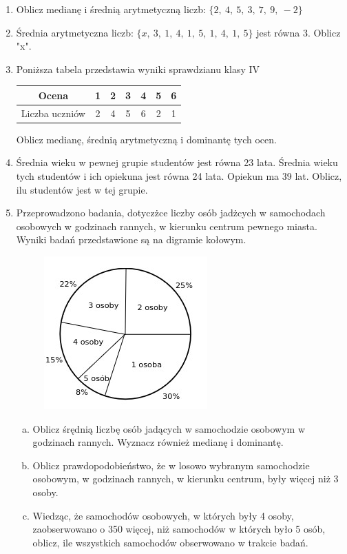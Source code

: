 \documentclass[12pt,a4paper]{article}
\begin{document}
\begin{enumerate}[1.]
	\item Oblicz medianę i średnią arytmetyczną liczb: $\{2,\:4,\:5,\:3,\:7,\:9,\:-2\}$
	\item Średnia arytmetyczna liczb: $\{x,\:3,\:1,\:4,\:1,\:5,\:1,\:4,\:1,\:5\}$ jest równa 3. Oblicz "x".
	\item Poniższa tabela przedstawia wyniki sprawdzianu klasy IV
	
	\begin{tabular}{|c|c|c|c|c|c|c|}
		\hline
		Ocena&1&2&3&4&5&6\\
		\hline
		Liczba uczniów&2&4&5&6&2&1\\
		\hline
	\end{tabular}
	
	Oblicz medianę, średnią arytmetyczną i dominantę tych ocen.
	
	\item Średnia wieku w pewnej grupie studentów jest równa 23 lata. Średnia wieku tych studentów i ich opiekuna jest równa 24 lata. Opiekun ma 39 lat. Oblicz, ilu studentów jest w tej grupie.
	
	\item Przeprowadzono badania, dotyczżce liczby osób jadżcych w samochodach osobowych w godzinach rannych, w kierunku centrum pewnego miasta. Wyniki badań przedstawione są na digramie kołowym.
	
	\begin{figure}[h]
		\centering
		\includegraphics{stat1.jpeg}
	\end{figure}
	\begin{enumerate}[a)]
		\item Oblicz śrędnią liczbę osób jadących w samochodzie osobowym w godzinach rannych. Wyznacz również medianę i dominantę.
		\item Oblicz prawdopodobieństwo, że w losowo wybranym samochodzie osobowym, w godzinach
		rannych, w kierunku centrum, były więcej niż 3 osoby.
		\item Wiedząc, że samochodów osobowych, w których były 4 osoby, zaobserwowano o 350 więcej,	niż samochodów w których było 5 osób, oblicz, ile wszystkich samochodów obserwowano w
		trakcie badań.
	\end{enumerate}
\end{enumerate}
\end{document}
